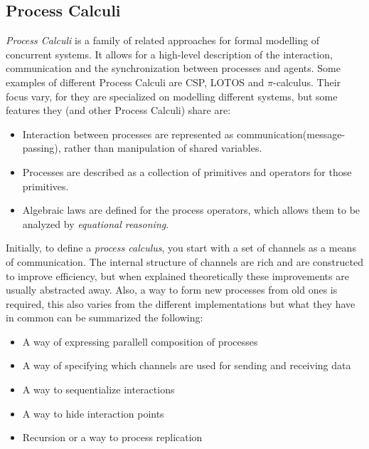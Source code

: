 

\subsection{Process Calculi}

\textit{Process Calculi} is a family of related approaches for formal modelling of concurrent systems. It allows for a high-level description of the interaction, communication and the synchronization between processes and agents. %
Some examples of different Process Calculi are CSP, LOTOS and $\pi$-calculus\cite{baeten2005brief}. Their focus vary, for they are specialized on modelling different systems, but some features they (and other Process Calculi) share are: \\

\begin{itemize}
	\setlength\itemsep{1em}

\item Interaction between processes are represented as communication(message-passing), rather than manipulation of shared variables. %
\item Processes are described as a collection of primitives and operators for those primitives. %
\item Algebraic laws are defined for the process operators, which allows them to be analyzed by \textit{equational reasoning}. \\ %
\end{itemize}

Initially, to define a \textit{process calculus}, you start with a set of channels as a means of communication. The internal structure of channels are rich and are constructed to improve efficiency, but when explained theoretically these improvements are usually abstracted away. Also, a way to form new processes from old ones is required, this also varies from the different implementations but what they have in common can be summarized the following: \\ %

\begin{itemize}
	\setlength\itemsep{1em}
\item A way of expressing parallell composition of processes
\item A way of specifying which channels are used for sending and receiving data
\item A way to sequentialize interactions
\item A way to hide interaction points
\item Recursion or a way to process replication \\
\end{itemize}

